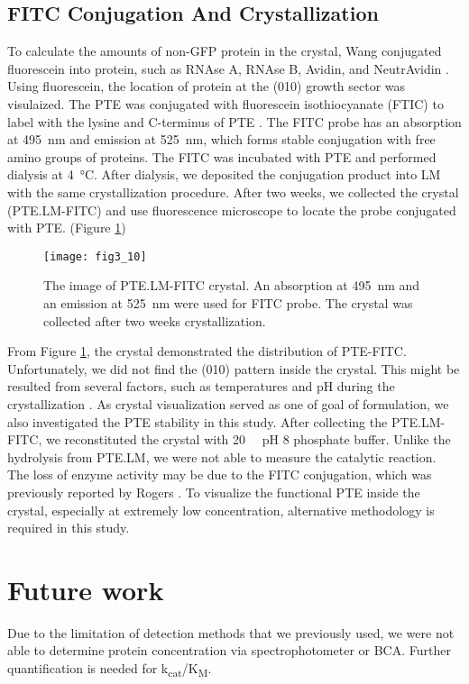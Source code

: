 \begin{refsection}
\subsection{FITC Conjugation And Crystallization}

To calculate the amounts of non-GFP protein in the crystal, Wang 
conjugated fluorescein into protein, such as RNAse A, RNAse B, Avidin, and
NeutrAvidin \cite{Wang2001a}. Using fluorescein, the location of protein at the
(010) growth sector was visulaized. The PTE was conjugated with fluorescein
isothiocyanate (FTIC) to label with the lysine and C-terminus of PTE
\cite{Rogers1999}. The FITC probe has an absorption at \SI{495}{\nm} and
emission at \SI{525}{\nm}, which forms stable conjugation with free amino
groups of proteins. 
The FITC was incubated with PTE and performed dialysis at \SI{4}{\celsius}. After
dialysis, we deposited the conjugation product into LM with the same
crystallization procedure. After two weeks, we collected the crystal
(PTE.LM-FITC) and use fluorescence microscope to locate the probe conjugated
with PTE. (Figure \ref{fig:ptelm-fitc})
\begin{figure}[htbp] \centering \texttt{[image: fig3\_10]} 
    \caption[The image of PTE.LM-FITC crystal. An absorption at \SI{495}{\nm}
    and an emission at \SI{525}{\nm} were used for FITC probe. The crystal was
collected after two weeks crystallization.]{The image of PTE.LM-FITC crystal.
    An absorption at \SI{495}{\nm} and an emission at \SI{525}{\nm} were used
for FITC probe. The crystal was collected after two weeks crystallization.}
\label{fig:ptelm-fitc} 
\end{figure}

From Figure \ref{fig:ptelm-fitc}, the crystal demonstrated the distribution of
PTE-FITC. Unfortunately, we did not find the (010) pattern inside the crystal.
This might be resulted from several factors, such as temperatures and pH during
the crystallization \cite{Wong2014}. As crystal visualization served as one of
goal of formulation, we also investigated the PTE stability in this study.
After collecting the PTE.LM-FITC, we reconstituted the crystal with
\SI{20}{\milli\Molar} pH 8 phosphate buffer. Unlike the hydrolysis from PTE.LM,
we were not able to measure the catalytic reaction. The loss of enzyme activity
may be due to the FITC conjugation, which was previously reported by
Rogers  \cite{Rogers1999}. To visualize the functional PTE inside
the crystal, especially at extremely low concentration, alternative methodology
is required in this study.

\section{Future work}

Due to the limitation of detection methods that we previously used, we were not
able to determine protein concentration via spectrophotometer or BCA. Further
quantification is needed for k\textsubscript{cat}/K\textsubscript{M}.

\printbibliography[heading=subbibliography]

\end{refsection}
